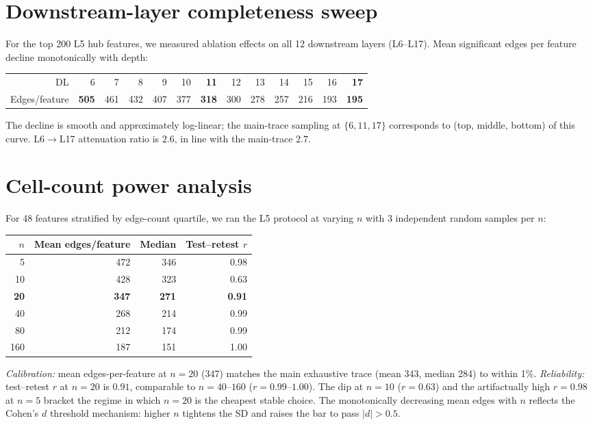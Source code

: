 \documentclass[10pt,letterpaper]{article}
\begin{document}
\section{Downstream-layer completeness sweep}
\label{supp:downstream_completeness}

For the top 200 L5 hub features, we measured ablation effects on all 12 downstream layers (L6--L17). Mean significant edges per feature decline monotonically with depth:

\begin{center}
\begin{tabular}{rrrrrrrrrrrrr}
\toprule
DL & 6 & 7 & 8 & 9 & 10 & \textbf{11} & 12 & 13 & 14 & 15 & 16 & \textbf{17} \\
Edges/feature & \textbf{505} & 461 & 432 & 407 & 377 & \textbf{318} & 300 & 278 & 257 & 216 & 193 & \textbf{195} \\
\bottomrule
\end{tabular}
\end{center}

The decline is smooth and approximately log-linear; the main-trace sampling at $\{6, 11, 17\}$ corresponds to (top, middle, bottom) of this curve. L6$\to$L17 attenuation ratio is $2.6$, in line with the main-trace $2.7$.


\section{Cell-count power analysis}
\label{supp:cellcount_power}

For 48 features stratified by edge-count quartile, we ran the L5 protocol at varying $n$ with 3 independent random samples per $n$:

\begin{center}
\begin{tabular}{rrrr}
\toprule
$n$ & Mean edges/feature & Median & Test--retest $r$ \\
\midrule
5   & 472 & 346 & 0.98 \\
10  & 428 & 323 & 0.63 \\
\textbf{20}  & \textbf{347} & \textbf{271} & \textbf{0.91} \\
40  & 268 & 214 & 0.99 \\
80  & 212 & 174 & 0.99 \\
160 & 187 & 151 & 1.00 \\
\bottomrule
\end{tabular}
\end{center}

\emph{Calibration:} mean edges-per-feature at $n=20$ (347) matches the main exhaustive trace (mean 343, median 284) to within 1\%. \emph{Reliability:} test--retest $r$ at $n=20$ is $0.91$, comparable to $n=40$--$160$ ($r=0.99$--$1.00$). The dip at $n=10$ ($r=0.63$) and the artifactually high $r=0.98$ at $n=5$ bracket the regime in which $n=20$ is the cheapest stable choice. The monotonically decreasing mean edges with $n$ reflects the Cohen's $d$ threshold mechanism: higher $n$ tightens the SD and raises the bar to pass $|d|>0.5$.
\end{document}
